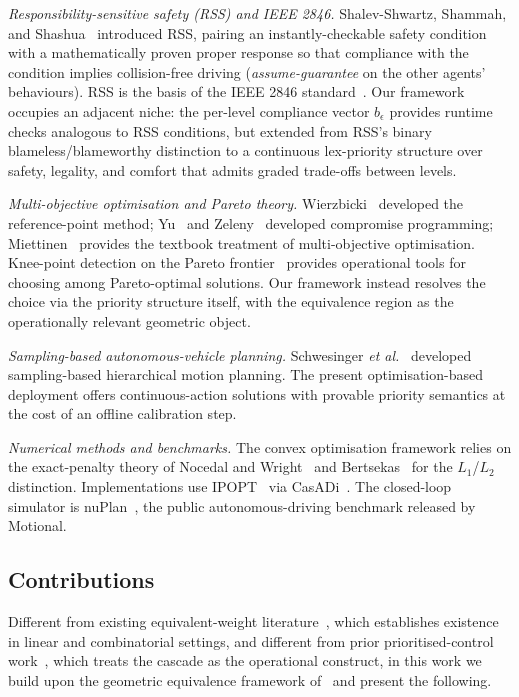 \emph{Responsibility-sensitive safety (RSS) and IEEE 2846.} Shalev-Shwartz, Shammah, and Shashua~\cite{shalev2017rss} introduced RSS, pairing an instantly-checkable safety condition with a mathematically proven proper response so that compliance with the condition implies collision-free driving (\emph{assume-guarantee} on the other agents' behaviours). RSS is the basis of the IEEE 2846 standard~\cite{ieee2846}. Our framework occupies an adjacent niche: the per-level compliance vector $b_\epsilon$ provides runtime checks analogous to RSS conditions, but extended from RSS's binary blameless/blameworthy distinction to a continuous lex-priority structure over safety, legality, and comfort that admits graded trade-offs between levels.

\emph{Multi-objective optimisation and Pareto theory.} Wierzbicki~\cite{wierzbicki1980} developed the reference-point method; Yu~\cite{yu1985compromise} and Zeleny~\cite{zeleny1982compromise} developed compromise programming; Miettinen~\cite{miettinen1999nonlinear} provides the textbook treatment of multi-objective optimisation. Knee-point detection on the Pareto frontier~\cite{branke2004knee,das1999knee} provides operational tools for choosing among Pareto-optimal solutions. Our framework instead resolves the choice via the priority structure itself, with the equivalence region as the operationally relevant geometric object.

\emph{Sampling-based autonomous-vehicle planning.} Schwesinger \emph{et al.}~\cite{schwesinger2018sampling} developed sampling-based hierarchical motion planning. The present optimisation-based deployment offers continuous-action solutions with provable priority semantics at the cost of an offline calibration step.

\emph{Numerical methods and benchmarks.} The convex optimisation framework relies on the exact-penalty theory of Nocedal and Wright~\cite{nocedal2006numerical} and Bertsekas~\cite{bertsekas1999nonlinear} for the $L_1$/$L_2$ distinction. Implementations use IPOPT~\cite{wachter2006ipopt} via CasADi~\cite{andersson2019casadi}. The closed-loop simulator is nuPlan~\cite{caesar2021nuplan}, the public autonomous-driving benchmark released by Motional.

\subsection{Contributions}
\label{sec:intro:contributions}

Different from existing equivalent-weight literature~\cite{sherali1982equivalent,eisenbrand2003lex}, which establishes existence in linear and combinatorial settings, and different from prior prioritised-control work~\cite{escande2014hqp,kanoun2011prioritized}, which treats the cascade as the operational construct, in this work we build upon the geometric equivalence framework of~\cite{lcp2025} and present the following.

